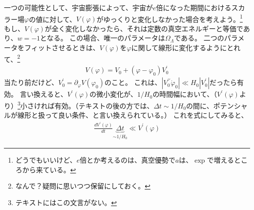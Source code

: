 \documentclass[11pt]{ltjsarticle}
\theoremstyle{plain}
\theoremstyle{break}
\begin{document}
一つの可能性として、宇宙膨張によって、宇宙が$e$倍になった期間におけるスカラー場$\varphi$の値に対して、$V(\varphi)$がゆっくりと変化しなかった場合を考えよう。\footnote{どうでもいいけど、$e$倍とか考えるのは、真空優勢で$a$は、$\exp$で増えるところから来ている。}
もし、$V(\varphi)$が全く変化しなかったら、それは定数の真空エネルギーと等価であり、$w = -1$となる。
この場合、唯一のパラメータは$\Omega_{\Lambda}$である。
二つのパラメータをフィットさせるときは、$V(\varphi)$を$\varphi$に関して線形に変化するようにとれて、\footnote{なんで？疑問に思いつつ保留にしておく。}
\begin{align}
  V(\varphi) = V_0 + (\varphi - \varphi_0) V_0^\prime
\end{align}%
当たり前だけど、$V_0^\prime = \partial_\varphi V(\varphi_0)$のこと。
これは、$\left|V_{0}^{\prime \prime} \dot{\varphi}_{0}\right| \ll H_{0}\left|V_{0}^{\prime}\right|$だったら有効。
言い換えると、$V^\prime(\varphi)$の微小変化が、$1/H_0$の時間幅において、（$V^\prime(\varphi)$より）\footnote{テキストにはこの文言がない。}小さければ有効。（テキストの後の方では、$\Delta t \sim 1/H_0$の間に、ポテンシャルが線形と扱って良い条件、と言い換えられている。）
これを式にしてみると、
\begin{align}
 \frac{d V^{\prime}(\varphi)}{dt} \underbrace{\Delta t}_{\sim 1/H_0} \ll V^\prime(\varphi)
\end{align}%
\end{document}

